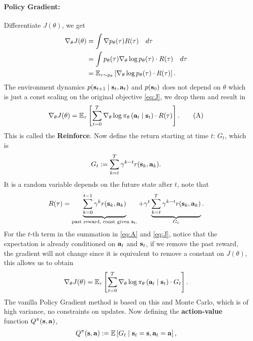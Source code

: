 \documentclass[11pt]{article}  %
\begin{document}
\paragraph{Policy Gradient:}
Differentiate $J(\theta)$, we get 
\begin{align*}
  \nabla_{\theta} J(\theta) &= \int \nabla p_\theta(\tau) R(\tau) \quad d\tau \\
  &= \int p_\theta(\tau) \nabla_{\theta} \log p_{\theta}(\tau) \cdot R(\tau) \quad d\tau \\
  &= \mathbb{E}_{\tau \sim p_\theta}\left[\nabla_\theta\log p_{\theta}(\tau)\cdot R(\tau)\right].
\end{align*}
The environment dynamics $p(\mathbf{s}_{t+1}\mid \mathbf{s}_t, \mathbf{a}_t)$ and $p(\mathbf{s}_0)$ does not depend on $\theta$ which is just a const scaling on the original objective \eqref{eq:J}, we drop them and result in
\begin{align}
  \label{eq:A}
  \nabla_{\theta} J(\theta) = \mathbb{E}_{\tau}\left[\sum_{t=0}^{T}\nabla_\theta \log \pi_{\theta}\left( \mathbf{a}_t \mid \mathbf{s}_t \right) \cdot R(\tau)\right]. \tag{A}
\end{align}
This is called the \textbf{Reinforce}.
Now define the return starting at time $t$: $G_t$, which is 
\begin{align*}
  G_t := \sum_{k=t}^{T}\gamma^{k - t}r(\mathbf{s}_k, \mathbf{a}_k).
\end{align*}
It is a random variable depends on the future state after $t$, note that 
\begin{align*}
  R(\tau) = \underbrace{\sum_{k=0}^{t-1}\gamma^k r(\mathbf{s}_k, \mathbf{a}_k)}_{\text{past reward, const given $\mathbf{s}_t$.}} + \gamma^t\underbrace{\sum_{k=t}^{T}\gamma^{k-t}r(\mathbf{s}_k, \mathbf{a}_k)}_{G_t}.
\end{align*}
For the $t$-th term in the summation in \eqref{eq:A} and \eqref{eq:J}, notice that the expectation is already conditioned on $\mathbf{a}_t$ and $\mathbf{s}_t$, if we remove the past reward, the gradient will not change since it is equivalent to remove a constant on $J(\theta)$, this allows us to obtain 
\begin{align}
  \label{eq:JG}
  \nabla_{\theta} J(\theta) = \mathbb{E}_{\tau}\left[\sum_{t=0}^{T}\nabla_\theta \log \pi_{\theta}\left( \mathbf{a}_t \mid \mathbf{s}_t \right) \cdot G_t\right].
\end{align}
The vanilla Policy Gradient method is based on this and Monte Carlo, which is of high variance, no constraints on updates.
Now defining the \textbf{action-value} function $Q^{\pi}(\mathbf{s}, \mathbf{a})$,
\begin{align*}
  Q^{\pi}(\mathbf{s}, \mathbf{a}) := \mathbb{E}\left[G_t \mid \mathbf{s}_t = \mathbf{s}, \mathbf{a}_t = \mathbf{a}\right],
\end{align*}
\end{document}
